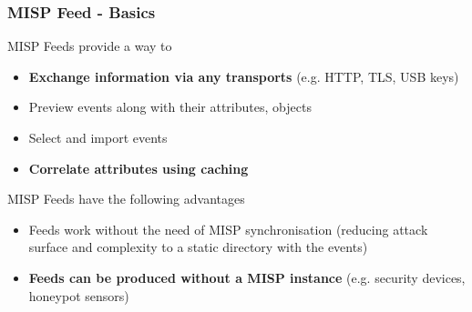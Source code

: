 


\begin{frame}[t,plain]
\titlepage
\end{frame}

\begin{frame}
    \frametitle{MISP Feed - Basics}
    MISP Feeds provide a way to
    \begin{itemize}
            \item {\bf Exchange information via any transports} (e.g. HTTP, TLS, USB keys)
        \item Preview events along with their attributes, objects
        \item Select and import events
        \item {\bf Correlate attributes using caching}
    \end{itemize}
     MISP Feeds have the following advantages
        \begin{itemize}
                \item Feeds work without the need of MISP synchronisation (reducing attack surface and complexity to a static directory with the events)\\
    \item {\bf Feeds can be produced without a MISP instance} (e.g. security devices, honeypot sensors)
        \end{itemize}
\end{frame}

